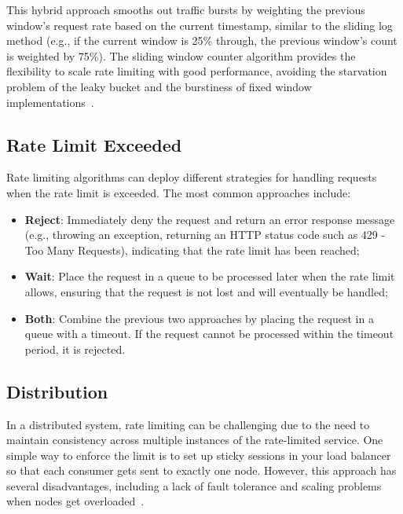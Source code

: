 This hybrid approach smooths out traffic bursts
by weighting the previous window’s request rate based on the current timestamp,
similar to the sliding log method
(e.g., if the current window is 25\% through, the previous window's count is weighted by 75\%).
The sliding window counter algorithm provides the flexibility to scale rate limiting with good performance, avoiding the starvation problem of the leaky bucket and the burstiness of fixed window implementations~\cite{kong-rate-limiting}.

\subsection{Rate Limit Exceeded}\label{subsec:rate-limiter-exceeded}

Rate limiting algorithms can deploy different strategies for handling requests when the rate limit is exceeded.
The most common approaches include:

\begin{itemize}
    \item \textbf{Reject}: Immediately deny the request and return an error response message (e.g., throwing an exception,
    returning an HTTP status code such as 429 - Too Many Requests), indicating that the rate limit has been reached;
    \item \textbf{Wait}: Place the request in a queue to be processed later when the rate limit allows, ensuring that the request is not lost and will eventually be handled;
    \item \textbf{Both}: Combine the previous two approaches by placing the request in a queue with a timeout.
    If the request cannot be processed within the timeout period, it is rejected.
\end{itemize}

\subsection{Distribution}\label{subsec:rate-limiter-distribution}

In a distributed system,
rate limiting can be challenging due to the need
to maintain consistency across multiple instances of the rate-limited service.
One simple way to enforce the limit is
to set up sticky sessions in your load balancer so that each consumer gets sent to exactly one node.
However, this approach has several disadvantages,
including a lack of fault tolerance and scaling problems when nodes get overloaded~\cite{kong-rate-limiting}.

